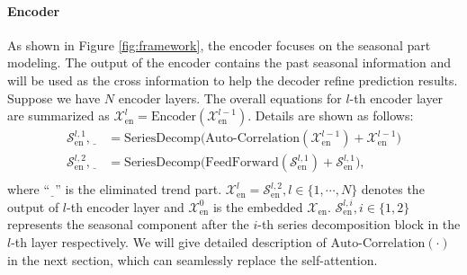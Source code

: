 \paragraph{Encoder} 
As shown in Figure \ref{fig:framework}, the encoder focuses on the seasonal part modeling. The output of the encoder contains the past seasonal information and will be used as the cross information to help the decoder refine prediction results. 
Suppose we have $N$ encoder layers. The overall equations for $l$-th encoder layer are summarized as $\mathcal{X}_{\mathrm{en}}^{l}=\mathrm{Encoder}(\mathcal{X}_{\mathrm{en}}^{l-1})$. Details are shown as follows:
\begin{equation}\label{equ:overall_encoder}
  \begin{split}
  \mathcal{S}_{\mathrm{en}}^{l,1},\underline{~~} & = \mathrm{SeriesDecomp}\Big(\mathrm{Auto\text{-}Correlation}(\mathcal{X}_{\mathrm{en}}^{l-1})+\mathcal{X}_{\mathrm{en}}^{l-1}\Big) \\
  \mathcal{S}_{\mathrm{en}}^{l,2},\underline{~~} & = \mathrm{SeriesDecomp}\Big(\mathrm{FeedForward}(\mathcal{S}_{\mathrm{en}}^{l,1})+\mathcal{S}_{\mathrm{en}}^{l,1}\Big), \\
  \end{split}
\end{equation}
where ``$\underline{~~}$'' is the eliminated trend part. $\mathcal{X}_{\mathrm{en}}^{l}=\mathcal{S}_{\mathrm{en}}^{l,2},l\in\{1,\cdots,N\}$ denotes the output of $l$-th encoder layer and $\mathcal{X}_{\mathrm{en}}^{0}$ is the embedded $\mathcal{X}_{\mathrm{en}}$. $\mathcal{S}_{\mathrm{en}}^{l,i},i\in\{1,2\}$ represents the seasonal component after the $i$-th series decomposition block in the $l$-th layer respectively. We will give detailed description of $\mathrm{Auto\text{-}Correlation}(\cdot)$ in the next section, which can seamlessly replace the self-attention.

